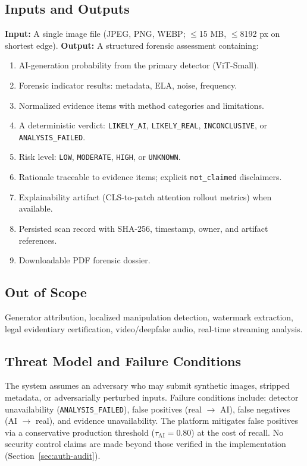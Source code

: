 \documentclass[10pt,conference,compsoc]{IEEEtran}
\begin{document}
\subsection{Inputs and Outputs}
\textbf{Input:} A single image file (JPEG, PNG, WEBP; $\le$15 MB, $\le$8192 px on shortest edge).
\textbf{Output:} A structured forensic assessment containing:
\begin{enumerate}
  \item AI-generation probability from the primary detector (ViT-Small).
  \item Forensic indicator results: metadata, ELA, noise, frequency.
  \item Normalized evidence items with method categories and limitations.
  \item A deterministic verdict: \texttt{LIKELY\_AI}, \texttt{LIKELY\_REAL}, \texttt{INCONCLUSIVE}, or \texttt{ANALYSIS\_FAILED}.
  \item Risk level: \texttt{LOW}, \texttt{MODERATE}, \texttt{HIGH}, or \texttt{UNKNOWN}.
  \item Rationale traceable to evidence items; explicit \texttt{not\_claimed} disclaimers.
  \item Explainability artifact (CLS-to-patch attention rollout metrics) when available.
  \item Persisted scan record with SHA-256, timestamp, owner, and artifact references.
  \item Downloadable PDF forensic dossier.
\end{enumerate}

\subsection{Out of Scope}
Generator attribution, localized manipulation detection, watermark extraction, legal evidentiary certification, video/deepfake audio, real-time streaming analysis.

\subsection{Threat Model and Failure Conditions}
The system assumes an adversary who may submit synthetic images, stripped metadata, or adversarially perturbed inputs.
Failure conditions include: detector unavailability (\texttt{ANALYSIS\_FAILED}), false positives (real $\to$ AI), false negatives (AI $\to$ real), and evidence unavailability.
The platform mitigates false positives via a conservative production threshold ($\tau_{\mathrm{AI}}=0.80$) at the cost of recall.
No security control claims are made beyond those verified in the implementation (Section~\ref{sec:auth-audit}).
\end{document}
